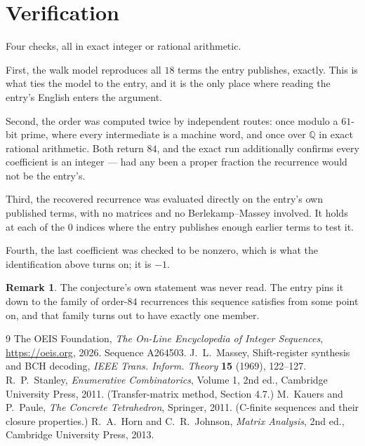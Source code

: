 \documentclass[11pt,a4paper]{article}
\theoremstyle{plain}
\theoremstyle{definition}
\newtheorem{remark}[theorem]{Remark}
\begin{document}
\section{Verification}

Four checks, all in exact integer or rational arithmetic.

First, the walk model reproduces all $18$ terms the entry publishes, exactly. This is
what ties the model to the entry, and it is the only place where reading the entry's English
enters the argument.

Second, the order was computed twice by independent routes: once modulo a $61$-bit prime, where
every intermediate is a machine word, and once over $\mathbb{Q}$ in exact rational arithmetic.
Both return $84$, and the exact run additionally confirms every coefficient is an integer
--- had any been a proper fraction the recurrence would not be the entry's.

Third, the recovered recurrence was evaluated directly on the entry's own published terms, with
no matrices and no Berlekamp--Massey involved. It holds at each of the $0$ indices where
the entry publishes enough earlier terms to test it.

Fourth, the last coefficient was checked to be nonzero, which is what the identification above
turns on; it is $-1$.

\begin{remark}
The conjecture's own statement was never read. The entry pins it down to the family of
order-$84$ recurrences this sequence satisfies from some point on, and that family turns
out to have exactly one member.
\end{remark}

\begin{thebibliography}{9}
 The OEIS Foundation, \emph{The On-Line Encyclopedia of Integer
Sequences}, \url{https://oeis.org}, 2026. Sequence A264503.
 J.~L.~Massey, Shift-register synthesis and BCH decoding, \emph{IEEE
Trans. Inform. Theory} \textbf{15} (1969), 122--127.
 R.~P.~Stanley, \emph{Enumerative Combinatorics}, Volume 1, 2nd ed.,
Cambridge University Press, 2011. (Transfer-matrix method, Section 4.7.)
 M.~Kauers and P.~Paule, \emph{The Concrete Tetrahedron}, Springer, 2011.
(C-finite sequences and their closure properties.)
 R.~A.~Horn and C.~R.~Johnson, \emph{Matrix Analysis}, 2nd ed., Cambridge
University Press, 2013.
\end{thebibliography}
\end{document}
